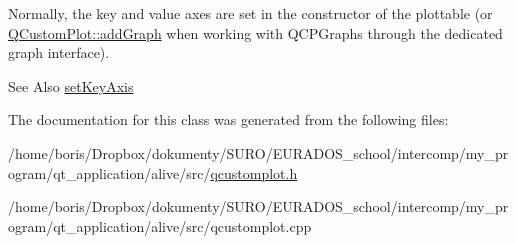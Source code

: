 Normally, the key and value axes are set in the constructor of the plottable (or \hyperlink{classQCustomPlot_a6fb2873d35a8a8089842d81a70a54167}{Q\-Custom\-Plot\-::add\-Graph} when working with Q\-C\-P\-Graphs through the dedicated graph interface).

\begin{DoxySeeAlso}{See Also}
\hyperlink{classQCPAbstractPlottable_a8524fa2994c63c0913ebd9bb2ffa3920}{set\-Key\-Axis} 
\end{DoxySeeAlso}


The documentation for this class was generated from the following files\-:\begin{DoxyCompactItemize}
\item 
/home/boris/\-Dropbox/dokumenty/\-S\-U\-R\-O/\-E\-U\-R\-A\-D\-O\-S\-\_\-school/intercomp/my\-\_\-program/qt\-\_\-application/alive/src/\hyperlink{qcustomplot_8h}{qcustomplot.\-h}\item 
/home/boris/\-Dropbox/dokumenty/\-S\-U\-R\-O/\-E\-U\-R\-A\-D\-O\-S\-\_\-school/intercomp/my\-\_\-program/qt\-\_\-application/alive/src/qcustomplot.\-cpp\end{DoxyCompactItemize}
